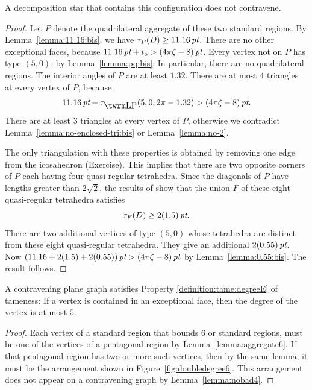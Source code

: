 \begin{lemma}\label{lemma:nobad4}
A decomposition star that contains this configuration does not
contravene.
\end{lemma}

\begin{proof}
Let $P$ denote the quadrilateral aggregate of these two standard
regions. By Lemma~\ref{lemma:11.16:bis}, we have $\tau_P(D)\ge
11.16\,\hbox{\it pt}$. There are no other exceptional faces, because
$11.16\,\hbox{\it pt}+t_5>(4\pi\zeta-8)\,\hbox{\it pt}$. Every vertex not on $P$ has type
$(5,0)$, by Lemma~\ref{lemma:pq:bis}. In particular, there are no
quadrilateral regions.  The interior angles of $P$ are at least
$1.32$. There are at most $4$ triangles at every vertex of $P$,
because
    $$
    11.16\,\pt+\tauLP(5,0,2\pi-1.32)>\squander.
    $$
There are at least $3$ triangles at every vertex of $P$, otherwise
we contradict Lemma~\ref{lemma:no-enclosed-tri:bis} or
Lemma~\ref{lemma:no-2}.

The only triangulation with these properties is obtained by
removing one edge from the icosahedron (Exercise).  This implies
that there are two opposite corners of $P$ each having four
quasi-regular tetrahedra. Since the diagonals of $P$ have lengths
greater than $2\sqrt{2}$, the results of  show
that the union $F$ of these eight quasi-regular tetrahedra
satisfies
    $$
    \tau_F(D) \ge 2(1.5)\,\hbox{\it pt}.
    $$
There are two additional vertices of type $(5,0)$ whose tetrahedra
are distinct from these eight quasi-regular tetrahedra. They give
an additional $2(0.55)\,\hbox{\it pt}$. Now
$(11.16+2(1.5)+2(0.55))\,\hbox{\it pt}>(4\pi\zeta-8)\,\hbox{\it pt}$ by
Lemma~\ref{lemma:0.55:bis}.   The result follows.
\end{proof}


\begin{lemma} \label{lemma:deg5}
A contravening plane graph satisfies Property
\ref{definition:tame:degreeE} of tameness: If a vertex is
contained in an exceptional face, then the degree of the vertex is
at most $5$.
\end{lemma}

\begin{proof} Each vertex of a standard region that bounds $6$
or standard regions, must be one of the vertices of a pentagonal
region by Lemma~\ref{lemma:aggregate6}.  If that pentagonal region
has two or more such vertices, then by the same lemma, it must be
the arrangement shown in Figure~\ref{fig:doubledegree6}.  This
arrangement does not appear on a contravening graph by
Lemma~\ref{lemma:nobad4}.
\end{proof}

